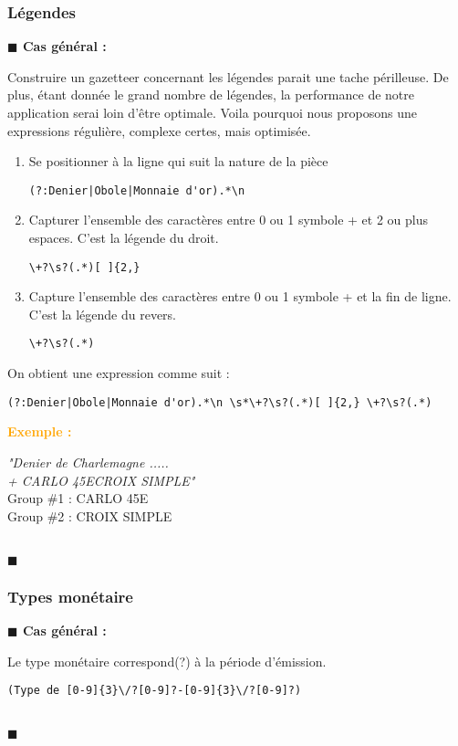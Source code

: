 \documentclass[a4paper, 11pt]{article}
\newenvironment{general}
    {
    \noindent\textbf{\textcolor{dark-blue}{$\blacksquare$  Cas général : \\}}
    }
    {
    ~\\\noindent\textcolor{dark-blue}{$\blacksquare$}\\
    }
\newenvironment{exemple}
    {
    \noindent\textbf{\textcolor{orange}{
    Exemple : \\}}
    }
    {\\
    }
\begin{document}
\subsubsection{Légendes}
\begin{general}
Construire un gazetteer concernant les légendes parait une tache périlleuse. De plus, étant donnée le grand nombre de légendes, la performance de notre application serai loin d'être optimale. Voila pourquoi nous proposons une expressions régulière, complexe certes, mais optimisée. \\
\begin{enumerate}
\item Se positionner à la ligne qui suit la nature de la pièce
\begin{verbatim}
(?:Denier|Obole|Monnaie d'or).*\n
\end{verbatim}
\item Capturer l'ensemble des caractères entre 0 ou 1 symbole + et 2 ou plus espaces. C'est la légende du droit.
\begin{verbatim}
\+?\s?(.*)[ ]{2,}
\end{verbatim}
\item Capture l'ensemble des caractères entre 0 ou 1 symbole + et la fin de ligne. C'est la légende du revers.
\begin{verbatim}
\+?\s?(.*)
\end{verbatim}
\end{enumerate}
On obtient une expression comme suit : 
\begin{verbatim}
(?:Denier|Obole|Monnaie d'or).*\n \s*\+?\s?(.*)[ ]{2,} \+?\s?(.*)
\end{verbatim}
\begin{exemple}
\emph{"Denier de Charlemagne ..... \\+ CARLO  45E\indent\indent CROIX SIMPLE"}\\
Group \#1 : CARLO  45E \\
Group \#2 : CROIX SIMPLE
\end{exemple}
\end{general}
\subsubsection{Types monétaire}
\begin{general}
Le type monétaire correspond(?) à la période d'émission.
\begin{verbatim}
(Type de [0-9]{3}\/?[0-9]?-[0-9]{3}\/?[0-9]?)
\end{verbatim}
\end{general}
\end{document}
